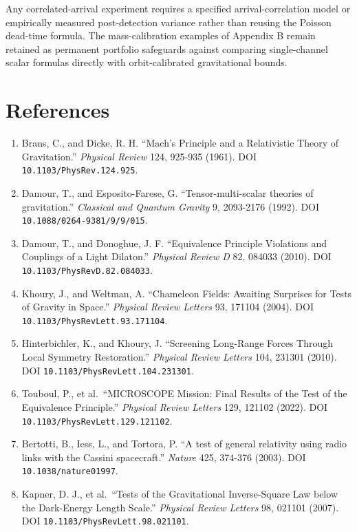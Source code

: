 \documentclass[
  american,
  11pt,
  letterpaper,
]{article}
\providecommand{\tightlist}{%
  \setlength{\itemsep}{0pt}\setlength{\parskip}{0pt}}
\begin{document}
Any correlated-arrival experiment requires a specified arrival-correlation model or empirically measured post-detection variance rather than reusing the Poisson dead-time formula. The mass-calibration examples of Appendix B remain retained as permanent portfolio safeguards against comparing single-channel scalar formulas directly with orbit-calibrated gravitational bounds.

\section{References}\label{references}

\begin{enumerate}
\def\labelenumi{\arabic{enumi}.}
\tightlist
\item
  Brans, C., and Dicke, R. H. ``Mach's Principle and a Relativistic Theory of Gravitation.'' \emph{Physical Review} 124, 925-935 (1961). DOI \nolinkurl{10.1103/PhysRev.124.925}.
\item
  Damour, T., and Esposito-Farese, G. ``Tensor-multi-scalar theories of gravitation.'' \emph{Classical and Quantum Gravity} 9, 2093-2176 (1992). DOI \nolinkurl{10.1088/0264-9381/9/9/015}.
\item
  Damour, T., and Donoghue, J. F. ``Equivalence Principle Violations and Couplings of a Light Dilaton.'' \emph{Physical Review D} 82, 084033 (2010). DOI \nolinkurl{10.1103/PhysRevD.82.084033}.
\item
  Khoury, J., and Weltman, A. ``Chameleon Fields: Awaiting Surprises for Tests of Gravity in Space.'' \emph{Physical Review Letters} 93, 171104 (2004). DOI \nolinkurl{10.1103/PhysRevLett.93.171104}.
\item
  Hinterbichler, K., and Khoury, J. ``Screening Long-Range Forces Through Local Symmetry Restoration.'' \emph{Physical Review Letters} 104, 231301 (2010). DOI \nolinkurl{10.1103/PhysRevLett.104.231301}.
\item
  Touboul, P., et al.~``MICROSCOPE Mission: Final Results of the Test of the Equivalence Principle.'' \emph{Physical Review Letters} 129, 121102 (2022). DOI \nolinkurl{10.1103/PhysRevLett.129.121102}.
\item
  Bertotti, B., Iess, L., and Tortora, P. ``A test of general relativity using radio links with the Cassini spacecraft.'' \emph{Nature} 425, 374-376 (2003). DOI \nolinkurl{10.1038/nature01997}.
\item
  Kapner, D. J., et al.~``Tests of the Gravitational Inverse-Square Law below the Dark-Energy Length Scale.'' \emph{Physical Review Letters} 98, 021101 (2007). DOI \nolinkurl{10.1103/PhysRevLett.98.021101}.

\end{enumerate}
\end{document}

